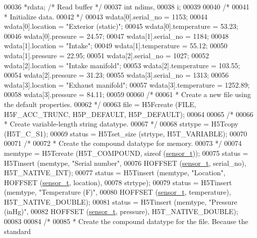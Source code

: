 \begin{DoxyCode}
00036                 *rdata;                     \textcolor{comment}{/* Read buffer */}
00037     \textcolor{keywordtype}{int}         ndims,
00038                 i;
00039 
00040     \textcolor{comment}{/*}
00041 \textcolor{comment}{     * Initialize data.}
00042 \textcolor{comment}{     */}
00043     wdata[0].serial\_no = 1153;
00044     wdata[0].location = \textcolor{stringliteral}{"Exterior (static)"};
00045     wdata[0].temperature = 53.23;
00046     wdata[0].pressure = 24.57;
00047     wdata[1].serial\_no = 1184;
00048     wdata[1].location = \textcolor{stringliteral}{"Intake"};
00049     wdata[1].temperature = 55.12;
00050     wdata[1].pressure = 22.95;
00051     wdata[2].serial\_no = 1027;
00052     wdata[2].location = \textcolor{stringliteral}{"Intake manifold"};
00053     wdata[2].temperature = 103.55;
00054     wdata[2].pressure = 31.23;
00055     wdata[3].serial\_no = 1313;
00056     wdata[3].location = \textcolor{stringliteral}{"Exhaust manifold"};
00057     wdata[3].temperature = 1252.89;
00058     wdata[3].pressure = 84.11;
00059 
00060     \textcolor{comment}{/*}
00061 \textcolor{comment}{     * Create a new file using the default properties.}
00062 \textcolor{comment}{     */}
00063     file = H5Fcreate (FILE, H5F\_ACC\_TRUNC, H5P\_DEFAULT, H5P\_DEFAULT);
00064 
00065     \textcolor{comment}{/*}
00066 \textcolor{comment}{     * Create variable-length string datatype.}
00067 \textcolor{comment}{     */}
00068     strtype = H5Tcopy (H5T\_C\_S1);
00069     status = H5Tset\_size (strtype, H5T\_VARIABLE);
00070 
00071     \textcolor{comment}{/*}
00072 \textcolor{comment}{     * Create the compound datatype for memory.}
00073 \textcolor{comment}{     */}
00074     memtype = H5Tcreate (H5T\_COMPOUND, \textcolor{keyword}{sizeof} (\hyperlink{structsensor__t}{sensor\_t}));
00075     status = H5Tinsert (memtype, \textcolor{stringliteral}{"Serial number"},
00076                 HOFFSET (\hyperlink{structsensor__t}{sensor\_t}, serial\_no), H5T\_NATIVE\_INT);
00077     status = H5Tinsert (memtype, \textcolor{stringliteral}{"Location"}, HOFFSET (\hyperlink{structsensor__t}{sensor\_t}, location),
00078                 strtype);
00079     status = H5Tinsert (memtype, \textcolor{stringliteral}{"Temperature (F)"},
00080                 HOFFSET (\hyperlink{structsensor__t}{sensor\_t}, temperature), H5T\_NATIVE\_DOUBLE);
00081     status = H5Tinsert (memtype, \textcolor{stringliteral}{"Pressure (inHg)"},
00082                 HOFFSET (\hyperlink{structsensor__t}{sensor\_t}, pressure), H5T\_NATIVE\_DOUBLE);
00083 
00084     \textcolor{comment}{/*}
00085 \textcolor{comment}{     * Create the compound datatype for the file.  Because the standard}

\end{DoxyCode}

